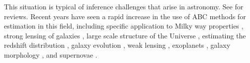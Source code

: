 \documentclass[ejs]{imsart}
\numberwithin{equation}{section}
\theoremstyle{plain}
\newcommand{\jessi}[1]{{\color{blue}[[\textbf{Jessi: }#1]]}}
\begin{document}
%
%
This situation is typical of inference challenges that arise in astronomy. See
\cite{schafer2012, AkeretEtAl2015, IshidaEtAl2015} for reviews.
Recent years have seen a
rapid increase in the use of ABC methods for estimation in this field, including
specific application to 
Milky way properties \citep{RobinEtAl2014},
strong lensing of galaxies \citep{Killedar2018,Birrer2017},
large scale structure of the Universe \citep{Hahn2017b},
estimating the redshift distribution \citep{Herbel2017},
galaxy evolution \citep{Hahn2017a},
weak lensing \citep{Peel2017,Lin2015},
exoplanets \citep{Parker2015},
galaxy morphology \citep{CameronPettitt2012},
and
supernovae \citep{WeyantEtAl2013}.
\end{document}
